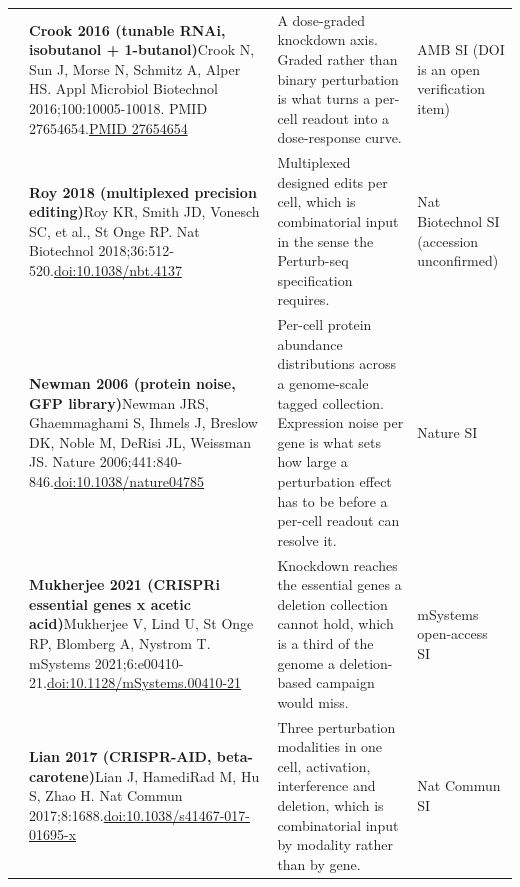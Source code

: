 \begin{landscape}
\begin{longtable}{@{}r@{\hspace{4pt}} L{86mm} L{92mm} L{62mm}@{}}
 & \textbf{Crook 2016 (tunable RNAi, isobutanol + 1-butanol)}\newline Crook N, Sun J, Morse N, Schmitz A, Alper HS. Appl Microbiol Biotechnol 2016;100:10005-10018. PMID 27654654.\newline \href{https://pubmed.ncbi.nlm.nih.gov/27654654/}{PMID 27654654} & A dose-graded knockdown axis. Graded rather than binary perturbation is what turns a per-cell readout into a dose-response curve. & AMB SI (DOI is an open verification item) \\
 & \textbf{Roy 2018 (multiplexed precision editing)}\newline Roy KR, Smith JD, Vonesch SC, et al., St Onge RP. Nat Biotechnol 2018;36:512-520.\newline \href{https://doi.org/10.1038/nbt.4137}{doi:10.1038/\allowbreak nbt.4137} & Multiplexed designed edits per cell, which is combinatorial input in the sense the Perturb-seq specification requires. & Nat Biotechnol SI (accession unconfirmed) \\
 & \textbf{Newman 2006 (protein noise, GFP library)}\newline Newman JRS, Ghaemmaghami S, Ihmels J, Breslow DK, Noble M, DeRisi JL, Weissman JS. Nature 2006;441:840-846.\newline \href{https://doi.org/10.1038/nature04785}{doi:10.1038/\allowbreak nature04785} & Per-cell protein abundance distributions across a genome-scale tagged collection. Expression noise per gene is what sets how large a perturbation effect has to be before a per-cell readout can resolve it. & Nature SI \\
 & \textbf{Mukherjee 2021 (CRISPRi essential genes x acetic acid)}\newline Mukherjee V, Lind U, St Onge RP, Blomberg A, Nystrom T. mSystems 2021;6:e00410-21.\newline \href{https://doi.org/10.1128/mSystems.00410-21}{doi:10.1128/\allowbreak mSystems.00410-21} & Knockdown reaches the essential genes a deletion collection cannot hold, which is a third of the genome a deletion-based campaign would miss. & mSystems open-access SI \\
 & \textbf{Lian 2017 (CRISPR-AID, beta-carotene)}\newline Lian J, HamediRad M, Hu S, Zhao H. Nat Commun 2017;8:1688.\newline \href{https://doi.org/10.1038/s41467-017-01695-x}{doi:10.1038/\allowbreak s41467-017-01695-x} & Three perturbation modalities in one cell, activation, interference and deletion, which is combinatorial input by modality rather than by gene. & Nat Commun SI \\

\end{longtable}
\end{landscape}
